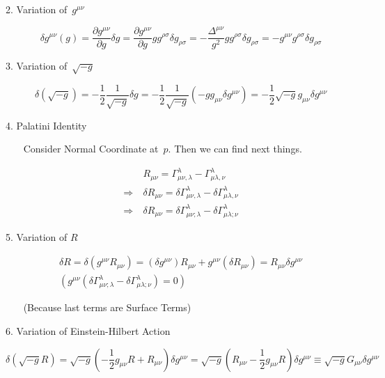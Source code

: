 \documentclass[10pt]{article}
\begin{document}
2. Variation of~\(g^{\mu\nu}\)

\begin{equation}
\delta g^{\mu\nu}(g) = \frac{\partial g^{\mu\nu}}{\partial g} \delta g = \frac{\partial g^{\mu\nu}}{\partial g} gg^{\rho\sigma}\delta g_{\rho\sigma} = -\frac{\Delta^{\mu\nu}}{g^2} g g^{\rho\sigma}\delta g_{\rho\sigma} = -g^{\mu\nu}g^{\rho\sigma} \delta g_{\rho\sigma}
\end{equation}

3. Variation of~\(\sqrt{-g}\)

\begin{equation}
\delta(\sqrt{-g}) = -\frac{1}{2}\frac{1}{\sqrt{-g}}\delta g = -\frac{1}{2}\frac{1}{\sqrt{-g}}\left(-gg_{\mu\nu}\delta g^{\mu\nu}\right) = -\frac{1}{2}\sqrt{-g}g_{\mu\nu}\delta g^{\mu\nu}
\end{equation}

4. Palatini Identity

~~~ Consider Normal Coordinate at~\(p\). Then we can find
next things.

\begin{equation}
\begin{aligned}
&R_{\mu\nu} = \Gamma^\lambda_{\mu\nu,\lambda} - \Gamma^\lambda_{\mu\lambda,\nu} \\
\Rightarrow ~ & \delta R_{\mu\nu} = \delta \Gamma^\lambda_{\mu\nu,\lambda} - \delta \Gamma^\lambda_{\mu\lambda,\nu} \\
\Rightarrow ~ & \delta R_{\mu\nu} = \delta \Gamma^\lambda_{\mu\nu;\lambda} - \delta\Gamma^\lambda_{\mu\lambda;\nu} 
\end{aligned}
\end{equation}

5. Variation of \(R\)

\begin{equation}
\begin{gathered}
\delta R = \delta(g^{\mu\nu}R_{\mu\nu}) = (\delta g^{\mu\nu})R_{\mu\nu} + g^{\mu\nu}(\delta R_{\mu\nu}) = R_{\mu\nu} \delta g^{\mu\nu}\\
(g^{\mu\nu}(\delta\Gamma^\lambda_{\mu\nu;\lambda}-\delta\Gamma^\lambda_{\mu\lambda;\nu}) = 0)
\end{gathered}
\end{equation}

~~~ (Because last terms are Surface Terms)

\par\null

6. Variation of Einstein-Hilbert Action

\begin{equation}
\delta(\sqrt{-g}R) = \sqrt{-g}\left(-\frac{1}{2}g_{\mu\nu}R + R_{\mu\nu}\right)\delta g^{\mu\nu} = \sqrt{-g}\left(R_{\mu\nu} - \frac{1}{2}g_{\mu\nu}R\right)\delta g^{\mu\nu} \equiv \sqrt{-g}G_{\mu\nu}\delta g^{\mu\nu}
\end{equation}
\end{document}
